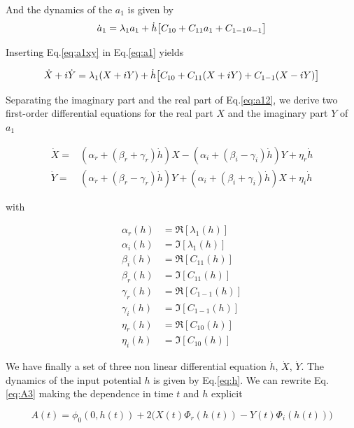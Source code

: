 \documentclass[12pt,twoside]{report}
\begin{document}
And the dynamics of the $a_1$ is given by
\begin{equation}
\label{eq:a1}
\dot{a}_1=\lambda_1 a_1 + \dot{h}\big[C_{10}+C_{11}a_1+C_{1-1}a_{-1}\big]\\
\end{equation}


Inserting Eq.\eqref{eq:a1xy} in Eq.\eqref{eq:a1} yields


\begin{equation}
\label{eq:a12}
\dot{X}+i\dot{Y}=\lambda_1(X + iY)+ \dot{h}\big[C_{10}+C_{11}(X + iY)+C_{1-1}(X - iY)\big]\\
\end{equation}

Separating the imaginary part and the real part of Eq.\eqref{eq:a12}, we derive two first-order differential equations for the real part $X$ and the imaginary part $Y$ of $a_{1}$

\begin{align}
\label{eq:X}
\dot{X}=&\left(\alpha_r+ (\beta_r+ \gamma_r)\dot{h}\right)X-\left(\alpha_i+ (\beta_i- \gamma_i)\dot{h}\right)Y +\eta_r\dot{h}\\
\label{eq:Y}
\dot{Y}=&\left(\alpha_r+ (\beta_r- \gamma_r)\dot{h}\right)Y+\left(\alpha_i+(\beta_i+ \gamma_i)\dot{h}\right)X +\eta_i\dot{h}
\end{align}

with

\begin{align}
\label{eq:first}
\alpha_r(h)&=\Re[\lambda_1(h)]\\
\alpha_i(h)&=\Im[\lambda_1(h)]\\
\beta_i(h)&=\Re[C_{11}(h)]\\
\beta_r(h)&=\Im[C_{11}(h)]\\
\gamma_r(h)&=\Re[C_{1-1}(h)]\\
\gamma_i(h)&=\Im[C_{1-1}(h)]\\
\eta_r(h)&=\Re[C_{10}(h)]\\
\eta_i(h)&=\Im[C_{10}(h)]	
\label{eq:last}
\end{align}


We have finally a set of three non linear differential equation $\dot{h}$, $\dot{X}$, $\dot{Y}$. The dynamics of the input potential $h$ is given by Eq.\eqref{eq:h}.
We can rewrite Eq.\eqref{eq:A3} making the dependence in time $t$ and $h$ explicit

\begin{equation}
\label{eq:A4}
A(t)=\phi_0(0,h(t)) + 2\big(X(t)\Phi_r(h(t))- Y(t)\Phi_i(h(t))\big)
\end{equation}
\end{document}
